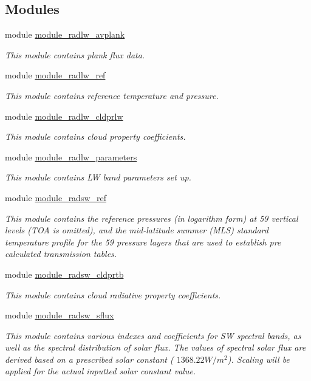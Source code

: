 \subsection*{Modules}
\begin{DoxyCompactItemize}
\item 
module \hyperlink{namespacemodule__radlw__avplank}{module\+\_\+radlw\+\_\+avplank}
\begin{DoxyCompactList}\small\item\em This module contains plank flux data. \end{DoxyCompactList}\item 
module \hyperlink{namespacemodule__radlw__ref}{module\+\_\+radlw\+\_\+ref}
\begin{DoxyCompactList}\small\item\em This module contains reference temperature and pressure. \end{DoxyCompactList}\item 
module \hyperlink{namespacemodule__radlw__cldprlw}{module\+\_\+radlw\+\_\+cldprlw}
\begin{DoxyCompactList}\small\item\em This module contains cloud property coefficients. \end{DoxyCompactList}\item 
module \hyperlink{namespacemodule__radlw__parameters}{module\+\_\+radlw\+\_\+parameters}
\begin{DoxyCompactList}\small\item\em This module contains LW band parameters set up. \end{DoxyCompactList}\item 
module \hyperlink{namespacemodule__radsw__ref}{module\+\_\+radsw\+\_\+ref}
\begin{DoxyCompactList}\small\item\em This module contains the reference pressures (in logarithm form) at 59 vertical levels (T\+OA is omitted), and the mid-\/latitude summer (M\+LS) standard temperature profile for the 59 pressure layers that are used to establish pre calculated transmission tables. \end{DoxyCompactList}\item 
module \hyperlink{namespacemodule__radsw__cldprtb}{module\+\_\+radsw\+\_\+cldprtb}
\begin{DoxyCompactList}\small\item\em This module contains cloud radiative property coefficients. \end{DoxyCompactList}\item 
module \hyperlink{namespacemodule__radsw__sflux}{module\+\_\+radsw\+\_\+sflux}
\begin{DoxyCompactList}\small\item\em This module contains various indexes and coefficients for SW spectral bands, as well as the spectral distribution of solar flux. The values of spectral solar flux are derived based on a prescribed solar constant ( $1368.22 W/m^2$). Scaling will be applied for the actual inputted solar constant value. \end{DoxyCompactList}\end{DoxyCompactItemize}
